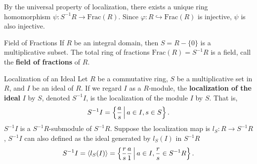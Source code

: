 \begin{prf}
    By the universal property of localization, there exists a unique ring homomorphism $\psi:S^{-1}R\to \mathrm{Frac}(R)$. Since $\varphi:R\hookrightarrow \mathrm{Frac}(R)$ is injective, $\psi$ is also injective.
\end{prf}

\begin{definition}{Field of Fractions}{}
    If $R$ be an integral domain, then $S=R-\{0\}$ is a multiplicative subset. The total ring of fractions $\mathrm{Frac}(R)=S^{-1}R$ is a field, call the \textbf{field of fractions} of $R$.
\end{definition}


\begin{definition}{Localization of an Ideal}{}
    Let $R$ be a commutative ring, $S$ be a multiplicative set in $R$, and $I$ be an ideal of $R$. If we regard $I$ as a $R$-module, the \textbf{localization of the ideal} $I$ by $S$, denoted $S^{-1}I$, is the localization of the module $I$ by $S$. That is,
    \[
        S^{-1}I=\left\{\frac{a}{s}\,\middle\vert\, a\in I, s\in S\right\}.
    \]
    $S^{-1}I$ is a $S^{-1}R$-submodule of $S^{-1}R$. Suppose the localization map is $l_S:R\to S^{-1}R$, $S^{-1}I$ can also defined as the ideal generated by $l_S(I)$ in $S^{-1}R$
    \[
        S^{-1}I=\langle l_S(I)\rangle=\left\{\frac{r}{s}\frac{a}{1}\,\middle\vert\, a\in I, \frac{r}{s}\in S^{-1}R\right\}.
    \]
\end{definition}


